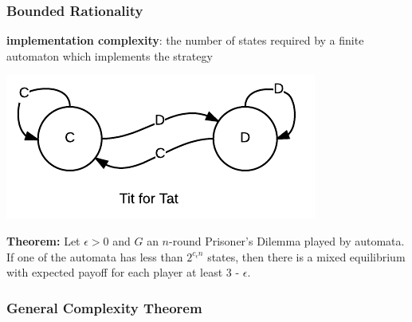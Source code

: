 \documentclass{beamer}
\begin{document}
\begin{frame}
	\frametitle{Bounded Rationality}
	\textbf{implementation complexity}: the number of states required by a finite automaton which implements the strategy	
	
	\includegraphics[scale=0.5]{tit4tat}
	
	
	\noindent \textbf{Theorem:} Let $\epsilon > 0$ and $G$ an $n$-round Prisoner's Dilemma played by automata. If one of the automata has less than $2^{c_\epsilon n}$ states, then there is a mixed equilibrium with expected payoff for each player at least 3 - $\epsilon$.
	
	
\end{frame}

\begin{frame}
	\frametitle{General Complexity Theorem}
\end{frame}
\end{document}
